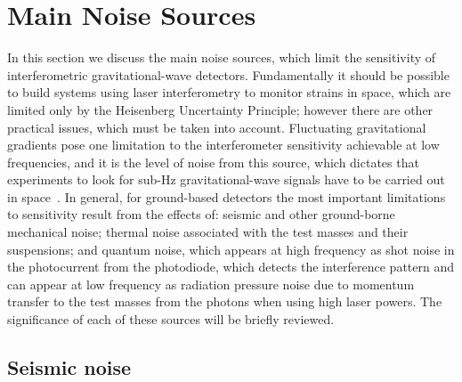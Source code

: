\section{Main Noise Sources}
\label{section:noise} 

In this section we discuss the main noise sources, which limit the sensitivity of
interferometric gravitational-wave detectors. Fundamentally it should be
possible to build systems using laser interferometry to monitor strains in space,
which are limited only by the Heisenberg Uncertainty Principle; however there
are other practical issues, which must be taken into account. Fluctuating
gravitational gradients pose one limitation to the interferometer sensitivity
achievable at low frequencies, and it is the level of noise from this source,
which dictates that experiments to look for sub-Hz gravitational-wave signals
have to be carried out in space~\cite{Spero, Saulson1, Beccaria, Thorne:1998}.
In general, for ground-based detectors the most important limitations to
sensitivity result from the effects of: seismic and other ground-borne mechanical
noise; thermal noise associated with the test masses and their suspensions; and
quantum noise, which appears at high frequency as shot noise in the photocurrent
from the photodiode, which detects the interference pattern and can appear at low
frequency as radiation pressure noise due to momentum transfer to the test
masses from the photons when using high laser powers. The significance of each
of these sources will be briefly reviewed.


\subsection{Seismic noise}
\label{subsection:seismic} 

